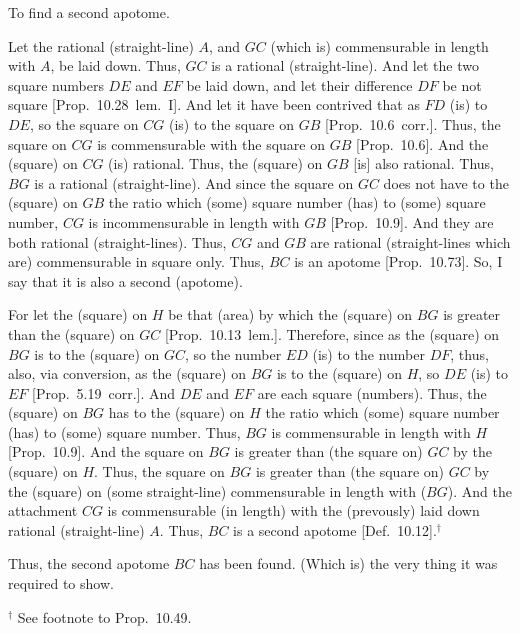 \begin{Parallel}{}{}
{To find a second apotome.

Let the rational (straight-line) $A$, and $GC$ (which is)
commensurable in length with $A$, be laid down. Thus, $GC$ is a rational (straight-line).
And let the two square numbers $DE$ and $EF$ be laid down, and let
their
difference $DF$ be not square [Prop.~10.28~lem.~I]. 
And let it have been contrived that as $FD$ (is) to $DE$, so the square on $CG$ (is) to the square on $GB$ [Prop.~10.6~corr.].
Thus, the square on $CG$ is commensurable with the square on $GB$ [Prop.~10.6]. And the (square) on $CG$ (is) rational.
Thus, the (square) on $GB$ [is] also rational. Thus, $BG$ is a rational
(straight-line).  And since the square on $GC$ does not have to the
(square) on $GB$ the ratio which (some) square number (has) to
(some) square number, $CG$ is incommensurable in length with $GB$
[Prop.~10.9]. And they are both rational (straight-lines). Thus, $CG$ and $GB$ are rational (straight-lines which are)
commensurable in square only. Thus, $BC$ is an apotome [Prop.~10.73]. So, I say that it is also a second
(apotome).

\epsfysize=0.65in
\centerline{}

For let the (square) on $H$ be that (area) by which the (square) on $BG$
is greater than the (square) on $GC$ [Prop.~10.13~lem.]. Therefore, since
as the (square) on $BG$ is to the (square) on $GC$, so the number $ED$
(is) to the number $DF$, thus, also, via conversion, as the (square) on $BG$
is to the (square) on $H$, so $DE$ (is) to $EF$ [Prop.~5.19~corr.]. And $DE$ and $EF$ are each
square (numbers). Thus, the (square) on $BG$ has to the (square)
on $H$ the ratio which (some) square number (has) to (some) square number.
Thus, $BG$ is commensurable in length with $H$ [Prop.~10.9]. 
And the square on $BG$ is greater than (the square on) $GC$ by the (square)
on $H$.
Thus, the square on $BG$ is greater
than (the square on) $GC$ by the (square) on (some straight-line)
commensurable in length with ($BG$). And the attachment $CG$
is commensurable (in length) with the (prevously) laid down rational (straight-line) $A$.
Thus, $BC$ is a second apotome [Def.~10.12].$^\dag$

Thus, the second apotome $BC$ has been found. (Which is) the very thing
it was required to show.}
\end{Parallel}
{\footnotesize\noindent$^\dag$ See footnote to Prop.~10.49.}

